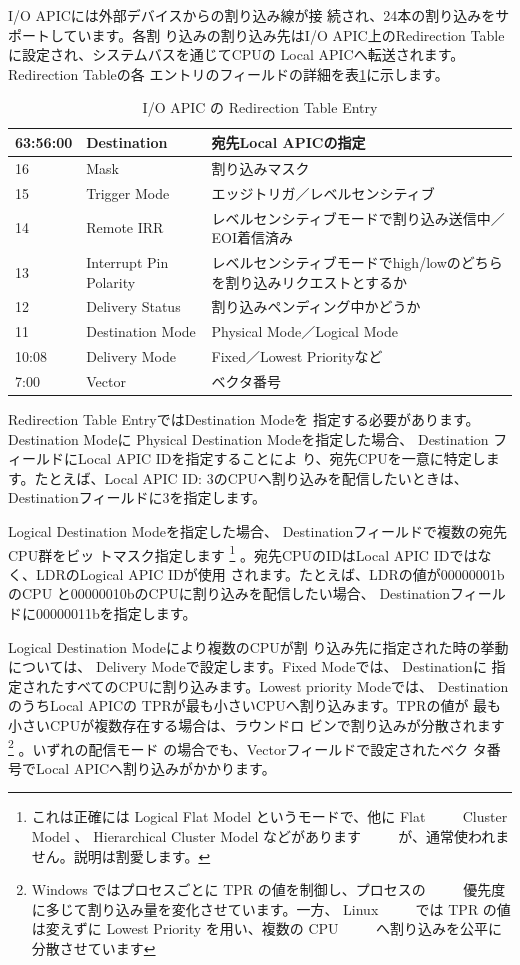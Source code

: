  I/O APICには外部デバイスからの割り込み線が接
続され、24本の割り込みをサポートしています。各割
り込みの割り込み先はI/O APIC上のRedirection
Tableに設定され、システムバスを通じてCPUの
Local APICへ転送されます。Redirection Tableの各
エントリのフィールドの詳細を表\ref{table2}に示します。

\begin{table}\centering
\begin{tabular}{|p{3cm}|p{3cm}|p{10cm}|} \hline
63:56:00 & Destination & 宛先Local APICの指定 \\ \hline
16 & Mask & 割り込みマスク \\ \hline
15 & Trigger Mode & エッジトリガ／レベルセンシティブ \\ \hline
14 & Remote IRR & レベルセンシティブモードで割り込み送信中／EOI着信済み \\ \hline
13 & Interrupt Pin Polarity & レベルセンシティブモードでhigh/lowのどちらを割り込みリクエストとするか \\ \hline
12 & Delivery Status & 割り込みペンディング中かどうか \\ \hline
11 & Destination Mode & Physical Mode／Logical Mode \\ \hline
10:08 & Delivery Mode & Fixed／Lowest Priorityなど \\ \hline
7:00 & Vector & ベクタ番号 \\ \hline
\end{tabular}
\caption{I/O APIC の Redirection Table Entry}
\label{table2}
\end{table}

 Redirection Table EntryではDestination Modeを
指定する必要があります。Destination Modeに
Physical Destination Modeを指定した場合、 Destination
フィールドにLocal APIC IDを指定することによ
り、宛先CPUを一意に特定します。たとえば、Local
APIC ID: 3のCPUへ割り込みを配信したいときは、
Destinationフィールドに3を指定します。

 Logical Destination Modeを指定した場合、
Destinationフィールドで複数の宛先CPU群をビッ
トマスク指定します
\footnote{これは正確には Logical Flat Model というモードで、他に Flat
　　   Cluster Model 、 Hierarchical Cluster Model などがあります
　　   が、通常使われません。説明は割愛します。}
。宛先CPUのIDはLocal
APIC IDではなく、LDRのLogical APIC IDが使用
されます。たとえば、LDRの値が00000001bのCPU
と00000010bのCPUに割り込みを配信したい場合、
Destinationフィールドに00000011bを指定します。

 Logical Destination Modeにより複数のCPUが割
り込み先に指定された時の挙動については、 Delivery
Modeで設定します。Fixed Modeでは、 Destinationに
指定されたすべてのCPUに割り込みます。Lowest
priority Modeでは、 DestinationのうちLocal APICの
TPRが最も小さいCPUへ割り込みます。TPRの値が
最も小さいCPUが複数存在する場合は、ラウンドロ
ビンで割り込みが分散されます
\footnote{Windows ではプロセスごとに TPR の値を制御し、プロセスの
　　   優先度に多じて割り込み量を変化させています。一方、 Linux
　　   では TPR の値は変えずに Lowest Priority を用い、複数の CPU
　　   へ割り込みを公平に分散させています}
。いずれの配信モード
の場合でも、Vectorフィールドで設定されたベク
タ番号でLocal APICへ割り込みがかかります。

